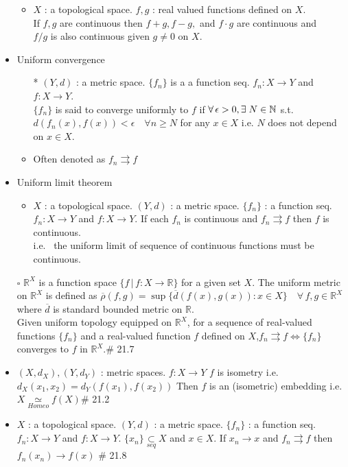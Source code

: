 \documentclass[12pt]{article}
\newcommand{\sq}{$\square$}
\newcommand{\spone}{\hspace{0.1cm}}
\newcommand{\Nat}{\mathbb{N}}
\newcommand{\Real}{\mathbb{R}}
\newcommand{\seq}{\underset{seq}{\subset}}
\newcommand{\exist}{\exists\spone}
\newcommand{\homeo}{\underset{Homeo}{\simeq}}
\begin{document}
\begin{itemize}
\begin{itemize}
		\item $X$ : a topological space. $f, g$ : real valued functions defined on $X$.\\If $f, g$ are continuous then $f+g, f-g,$ and $f\cdot g$ are continuous and\\ $f/g$ is also continuous given $g\neq 0$ on $X$.
	\end{itemize}
	\item Uniform convergence
	\begin{itemize}
		\item[*] $(Y,d)$ : a metric space. $\{f_n\}$ is a a function seq. $f_n : X\rightarrow Y$ and $f: X\rightarrow Y$.\\ $\{f_n\}$ is said to converge uniformly to $f$ if $\forall \, \epsilon>0, \exist N\in \Nat$ s.t. \\$d(f_n(x), f(x))<\epsilon \quad \forall n\geq N$ for any $x\in X$ \quad i.e. \quad $N$ does not depend on $x\in X$.
		\item Often denoted as $f_n\rightrightarrows f$ 
	\end{itemize}
	\item Uniform limit theorem
	\begin{itemize}
		\item $X$ : a topological space. $(Y,d)$ : a metric space. $\{f_n\}$ : a function seq. $f_n : X\rightarrow Y$ and $f: X\rightarrow Y$. If each $f_n$ is continuous and $f_n\rightrightarrows f$ then $f$ is continuous. \\ i.e. \, the uniform limit of sequence of continuous functions must be continuous.
	\end{itemize}
	\item[\sq] $\Real^X$ is a function space $\{ f\, |\, f: X\rightarrow \Real \}$ for a given set $X$. The uniform metric on $\Real^X$ is defined as $\overline{\rho}(f,g)=\sup\{\overline{d}(f(x), g(x)) : x\in X\}\quad \forall \, f,g\in \Real^X$ where $\overline{d}$ is standard bounded metric on $\Real$.\\ Given uniform topology equipped on $\Real^X$, for a sequence of real-valued functions $\{f_n\}$ and a real-valued function $f$ defined on $X$,\quad $f_n\rightrightarrows f \Leftrightarrow \{f_n\}$ converges to $f$ in $\Real^X$.\quad \# 21.7
	\item $(X, d_X),(Y, d_Y)$ : metric spaces. $f : X\rightarrow Y $ $f$ is isometry \; i.e. $d_X(x_1, x_2)=d_Y(f(x_1), f(x_2))$ Then $f$ is an (isometric) embedding \; i.e. $X\homeo f(X)$\quad  \# 21.2
	\item $X$ : a topological space. $(Y,d)$ : a metric space. $\{f_n\}$ : a function seq. $f_n : X\rightarrow Y$ and $f: X\rightarrow Y$. \; $\{x_n\}\seq X$ and $x\in X$. If $x_n\rightarrow x$ and $f_n\rightrightarrows f$ then $f_n(x_n)\rightarrow f(x)$ \; \# 21.8  
\end{itemize}
\bigskip
\end{document}
